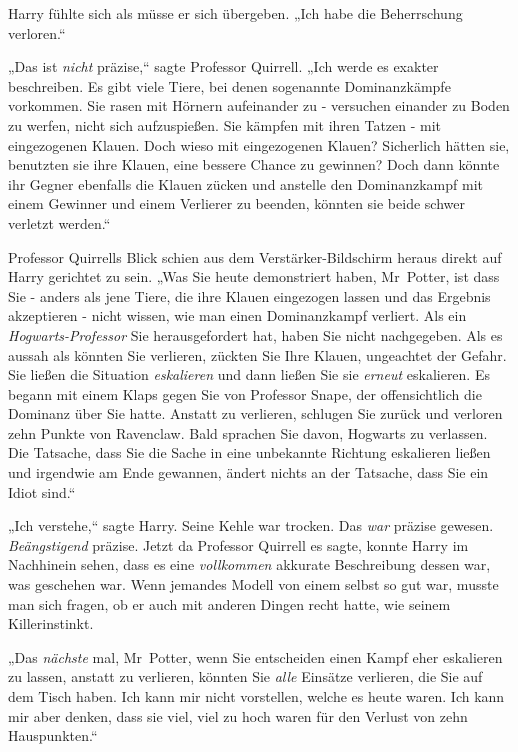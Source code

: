 {Harry fühlte sich als müsse er sich übergeben. „Ich habe die Beherrschung verloren.“

„Das ist \emph{nicht} präzise,“ sagte Professor Quirrell. „Ich werde es exakter beschreiben. Es gibt viele Tiere, bei denen sogenannte Dominanzkämpfe vorkommen. Sie rasen mit Hörnern aufeinander zu - versuchen einander zu Boden zu werfen, nicht sich aufzuspießen. Sie kämpfen mit ihren Tatzen - mit eingezogenen Klauen. Doch wieso mit eingezogenen Klauen? Sicherlich hätten sie, benutzten sie ihre Klauen, eine bessere Chance zu gewinnen? Doch dann könnte ihr Gegner ebenfalls die Klauen zücken und anstelle den Dominanzkampf mit einem Gewinner und einem Verlierer zu beenden, könnten sie beide schwer verletzt werden.“

Professor Quirrells Blick schien aus dem Verstärker-Bildschirm heraus direkt auf Harry gerichtet zu sein. „Was Sie heute demonstriert haben, Mr~Potter, ist dass Sie - anders als jene Tiere, die ihre Klauen eingezogen lassen und das Ergebnis akzeptieren - nicht wissen, wie man einen Dominanzkampf verliert. Als ein \emph{Hogwarts-Professor} Sie herausgefordert hat, haben Sie nicht nachgegeben. Als es aussah als könnten Sie verlieren, zückten Sie Ihre Klauen, ungeachtet der Gefahr. Sie ließen die Situation \emph{eskalieren} und dann ließen Sie sie \emph{erneut} eskalieren. Es begann mit einem Klaps gegen Sie von Professor Snape, der offensichtlich die Dominanz über Sie hatte. Anstatt zu verlieren, schlugen Sie zurück und verloren zehn Punkte von Ravenclaw. Bald sprachen Sie davon, Hogwarts zu verlassen. Die Tatsache, dass Sie die Sache in eine unbekannte Richtung eskalieren ließen und irgendwie am Ende gewannen, ändert nichts an der Tatsache, dass Sie ein Idiot sind.“

„Ich verstehe,“ sagte Harry. Seine Kehle war trocken. Das \emph{war} präzise gewesen. \emph{Beängstigend} präzise. Jetzt da Professor Quirrell es sagte, konnte Harry im Nachhinein sehen, dass es eine \emph{vollkommen} akkurate Beschreibung dessen war, was geschehen war. Wenn jemandes Modell von einem selbst so gut war, musste man sich fragen, ob er auch mit anderen Dingen recht hatte, wie seinem Killerinstinkt.

„Das \emph{nächste} mal, Mr~Potter, wenn Sie entscheiden einen Kampf eher eskalieren zu lassen, anstatt zu verlieren, könnten Sie \emph{alle} Einsätze verlieren, die Sie auf dem Tisch haben. Ich kann mir nicht vorstellen, welche es heute waren. Ich kann mir aber denken, dass sie viel, viel zu hoch waren für den Verlust von zehn Hauspunkten.“

}
